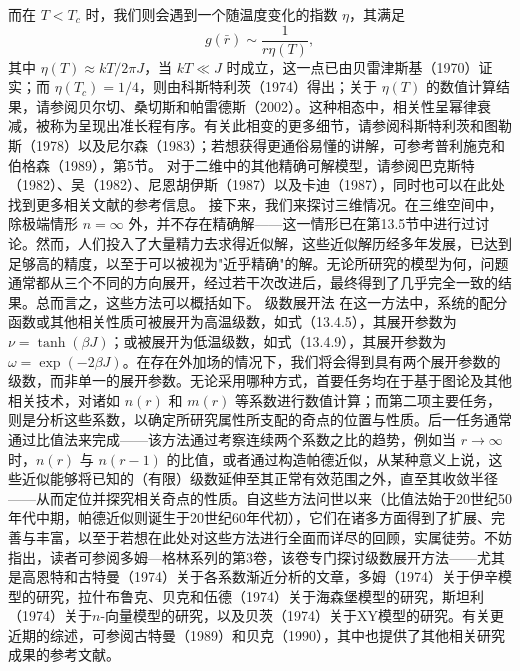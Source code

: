 而在 \(T < T_{c}\) 时，我们则会遇到一个随温度变化的指数 \(\eta\)，其满足
\begin{equation}\tag{13.7.5}\label{eq:13.7.5}
g ( \bar { r } ) \sim \frac { 1 } { r \eta ( T ) } ,
\end{equation}
其中 \(\eta(T) \approx kT/2\pi J\)，当 \(kT \ll J\) 时成立，这一点已由贝雷津斯基（1970）证实；而 \(\eta(T_c) = 1/4\)，则由科斯特利茨（1974）得出；关于 \(\eta(T)\) 的数值计算结果，请参阅贝尔切、桑切斯和帕雷德斯（2002）。这种相态中，相关性呈幂律衰减，被称为呈现出准长程有序。有关此相变的更多细节，请参阅科斯特利茨和图勒斯（1978）以及尼尔森（1983）；若想获得更通俗易懂的讲解，可参考普利施克和伯格森（1989），第5节。
对于二维中的其他精确可解模型，请参阅巴克斯特（1982）、吴（1982）、尼恩胡伊斯（1987）以及卡迪（1987），同时也可以在此处找到更多相关文献的参考信息。
接下来，我们来探讨三维情况。在三维空间中，除极端情形 \(n=\infty\) 外，并不存在精确解——这一情形已在第13.5节中进行过讨论。然而，人们投入了大量精力去求得近似解，这些近似解历经多年发展，已达到足够高的精度，以至于可以被视为"近乎精确"的解。无论所研究的模型为何，问题通常都从三个不同的方向展开，经过若干次改进后，最终得到了几乎完全一致的结果。总而言之，这些方法可以概括如下。
级数展开法
在这一方法中，系统的配分函数或其他相关性质可被展开为高温级数，如式（13.4.5），其展开参数为 \(\nu = \tanh(\beta J)\)；或被展开为低温级数，如式（13.4.9），其展开参数为 \(\omega = \exp(-2\beta J)\)。在存在外加场的情况下，我们将会得到具有两个展开参数的级数，而非单一的展开参数。无论采用哪种方式，首要任务均在于基于图论及其他相关技术，对诸如 \(n(r)\) 和 \(m(r)\) 等系数进行数值计算；而第二项主要任务，则是分析这些系数，以确定所研究属性所支配的奇点的位置与性质。后一任务通常通过比值法来完成——该方法通过考察连续两个系数之比的趋势，例如当 \(r \to \infty\) 时，\(n(r)\) 与 \(n(r-1)\) 的比值，或者通过构造帕德近似，从某种意义上说，这些近似能够将已知的（有限）级数延伸至其正常有效范围之外，直至其收敛半径——从而定位并探究相关奇点的性质。自这些方法问世以来（比值法始于20世纪50年代中期，帕德近似则诞生于20世纪60年代初），它们在诸多方面得到了扩展、完善与丰富，以至于若想在此处对这些方法进行全面而详尽的回顾，实属徒劳。不妨指出，读者可参阅多姆---格林系列的第3卷，该卷专门探讨级数展开方法——尤其是高恩特和古特曼（1974）关于各系数渐近分析的文章，多姆（1974）关于伊辛模型的研究，拉什布鲁克、贝克和伍德（1974）关于海森堡模型的研究，斯坦利（1974）关于\(n\)-向量模型的研究，以及贝茨（1974）关于XY模型的研究。有关更近期的综述，可参阅古特曼（1989）和贝克（1990），其中也提供了其他相关研究成果的参考文献。
